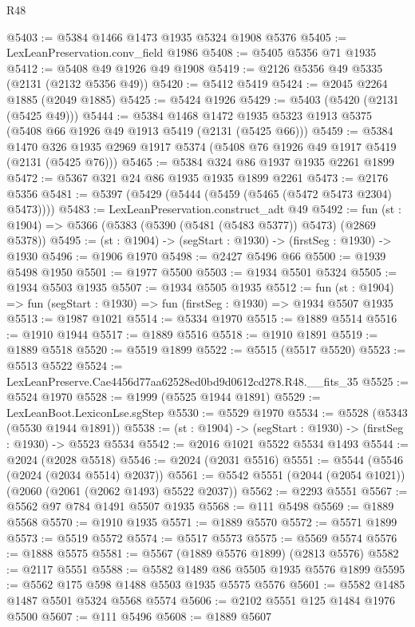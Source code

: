 \begin{lexlean}{R48}
\begin{coremodule}
@5403 := @5384 @1466 @1473 @1935 @5324 @1908 @5376
@5405 := LexLeanPreservation.conv_field @1986
@5408 := @5405 @5356 @71 @1935
@5412 := @5408 @49 @1926 @49 @1908
@5419 := @2126 @5356 @49 @5335 (@2131 (@2132 @5356 @49))
@5420 := @5412 @5419
@5424 := @2045 @2264 @1885 (@2049 @1885)
@5425 := @5424 @1926
@5429 := @5403 (@5420 (@2131 (@5425 @49)))
@5444 := @5384
    @1468
    @1472
    @1935
    @5323
    @1913
    @5375
    (@5408 @66 @1926 @49 @1913 @5419 (@2131 (@5425 @66)))
@5459 := @5384
    @1470
    @326
    @1935
    @2969
    @1917
    @5374
    (@5408 @76 @1926 @49 @1917 @5419 (@2131 (@5425 @76)))
@5465 := @5384 @324 @86 @1937 @1935 @2261 @1899
@5472 := @5367 @321 @24 @86 @1935 @1935 @1899 @2261
@5473 := @2176 @5356
@5481 := @5397 (@5429 (@5444 (@5459 (@5465 (@5472 @5473 @2304) @5473))))
@5483 := LexLeanPreservation.construct_adt @49
@5492 := fun (st : @1904) => @5366 (@5383 (@5390 (@5481 (@5483 @5377)) @5473) (@2869 @5378))
@5495 := (st : @1904) -> (segStart : @1930) -> (firstSeg : @1930) -> @1930
@5496 := @1906 @1970
@5498 := @2427 @5496 @66
@5500 := @1939 @5498 @1950
@5501 := @1977 @5500
@5503 := @1934 @5501 @5324
@5505 := @1934 @5503 @1935
@5507 := @1934 @5505 @1935
@5512 := fun (st : @1904) => fun (segStart : @1930) => fun (firstSeg : @1930) => @1934 @5507 @1935
@5513 := @1987 @1021
@5514 := @5334 @1970
@5515 := @1889 @5514
@5516 := @1910 @1944
@5517 := @1889 @5516
@5518 := @1910 @1891
@5519 := @1889 @5518
@5520 := @5519 @1899
@5522 := @5515 (@5517 @5520)
@5523 := @5513 @5522
@5524 := LexLeanPreserve.Cae4456d77aa62528ed0bd9d0612cd278.R48.__fits_35
@5525 := @5524 @1970
@5528 := @1999 (@5525 @1944 @1891)
@5529 := LexLeanBoot.LexiconLse.sgStep
@5530 := @5529 @1970
@5534 := @5528 (@5343 (@5530 @1944 @1891))
@5538 := (st : @1904) -> (segStart : @1930) -> (firstSeg : @1930) -> @5523 @5534
@5542 := @2016 @1021 @5522 @5534 @1493
@5544 := @2024 (@2028 @5518)
@5546 := @2024 (@2031 @5516)
@5551 := @5544 (@5546 (@2024 (@2034 @5514) @2037))
@5561 := @5542 @5551 (@2044 (@2054 @1021)) (@2060 (@2061 (@2062 @1493) @5522 @2037))
@5562 := @2293 @5551
@5567 := @5562 @97 @784 @1491 @5507 @1935
@5568 := @111 @5498
@5569 := @1889 @5568
@5570 := @1910 @1935
@5571 := @1889 @5570
@5572 := @5571 @1899
@5573 := @5519 @5572
@5574 := @5517 @5573
@5575 := @5569 @5574
@5576 := @1888 @5575
@5581 := @5567 (@1889 @5576 @1899) (@2813 @5576)
@5582 := @2117 @5551
@5588 := @5582 @1489 @86 @5505 @1935 @5576 @1899
@5595 := @5562 @175 @598 @1488 @5503 @1935 @5575 @5576
@5601 := @5582 @1485 @1487 @5501 @5324 @5568 @5574
@5606 := @2102 @5551 @125 @1484 @1976 @5500
@5607 := @111 @5496
@5608 := @1889 @5607

\end{coremodule}
\end{lexlean}
